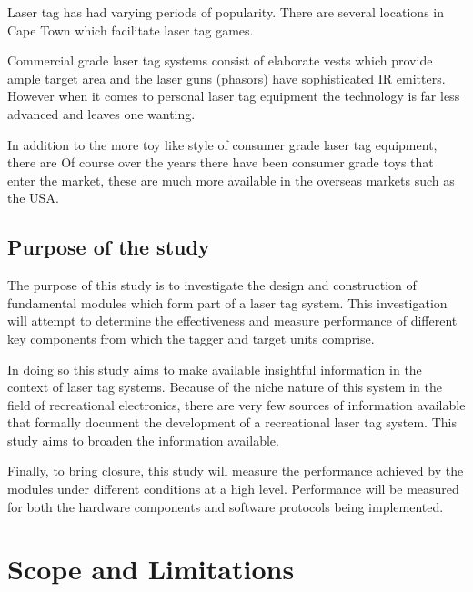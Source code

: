 Laser tag has had varying periods of popularity.
There are several locations in Cape Town which facilitate laser tag games.

Commercial grade laser tag systems consist of elaborate vests which provide ample target area and the laser guns (phasors) have sophisticated IR emitters. However when it comes to personal laser tag equipment the technology is far less advanced and leaves one wanting.

In addition to the more toy like style of consumer grade laser tag equipment, there are  Of course over the years there have been consumer grade toys that enter the market, these are much more available in the overseas markets such as the USA.

\subsection{Purpose of the study}



The purpose of this study is to investigate the design and construction of fundamental modules which form part of a laser tag system. This investigation will attempt to determine the effectiveness and measure performance of different key components from which the tagger and target units comprise.

In doing so this study aims to make available insightful information in the context of laser tag systems. Because of the niche nature of this system in the field of recreational electronics, there are very few sources of information available that formally document the development of a recreational laser tag system. This study aims to broaden the information available.

Finally, to bring closure, this study will measure the performance achieved by the modules under different conditions at a high level. Performance will be measured for both the hardware components and software protocols being implemented.


\section{Scope and Limitations}


